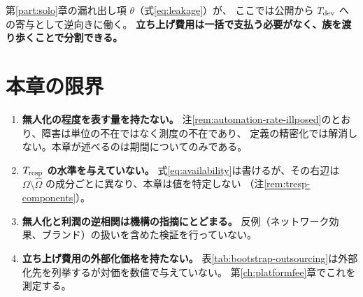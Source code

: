 第\ref{part:solo}章の漏れ出し項 $\theta$（式\eqref{eq:leakage}）が、
ここでは公開から $T_{\rm dev}$ への寄与として逆向きに働く。
\textbf{立ち上げ費用は一括で支払う必要がなく、族を渡り歩くことで分割できる。}

\section{本章の限界}
\label{sec:unmanned-limits}

\begin{enumerate}[label=(\arabic*)]
\item \textbf{無人化の程度を表す量を持たない。}
注\ref{rem:automation-rate-illposed}のとおり、障害は単位の不在ではなく測度の不在であり、
定義の精密化では解消しない。本章が述べるのは期間についてのみである。

\item \textbf{$T_{\rm resp}$ の水準を与えていない。}
式\eqref{eq:availability}は書けるが、その右辺は
$\Omega\setminus\hat\Omega$ の成分ごとに異なり、本章は値を特定しない
（注\ref{rem:tresp-components}）。

\item \textbf{無人化と利潤の逆相関は機構の指摘にとどまる。}
反例（ネットワーク効果、ブランド）の扱いを含めた検証を行っていない。

\item \textbf{立ち上げ費用の外部化価格を持たない。}
表\ref{tab:bootstrap-outsourcing}は外部化先を列挙するが対価を数値で与えていない。
第\ref{ch:platformfee}章でこれを測定する。
\end{enumerate}

